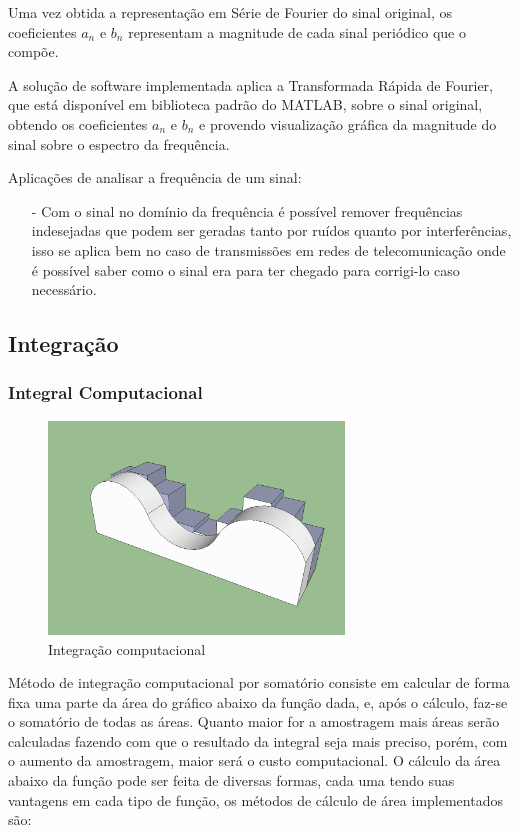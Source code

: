\documentclass[12pt,a4paper]{report}
\begin{document}
Uma vez obtida a representação em Série de Fourier do sinal original, os coeficientes \(a_{n}\) e \(b_{n}\) representam a magnitude de cada sinal periódico que o compõe.

A solução de software implementada aplica a Transformada Rápida de Fourier, que está disponível em biblioteca padrão do MATLAB, sobre o sinal original, obtendo os coeficientes \(a_{n}\) e \(b_{n}\) e provendo visualização gráfica da magnitude do sinal sobre o espectro da frequência.

Aplicações de analisar a frequência de um sinal:

\begin{itemize}
\item [-] Com o sinal no domínio da frequência é possível remover frequências indesejadas que podem ser geradas tanto por ruídos quanto por interferências, isso se aplica bem no caso de transmissões em redes de telecomunicação onde é possível saber como o sinal era para ter chegado para corrigi-lo caso necessário.
\end{itemize}

\subsection{Integração}

\subsubsection{Integral Computacional}

\begin{figure}[h]
\centering
\includegraphics[width=0.7\textwidth]{integracao.png}
\caption{Integração computacional}
\label{fig:integracao}
\end{figure}

Método de integração computacional por somatório consiste em calcular de forma fixa uma parte da área do gráfico abaixo da função dada, e, após o cálculo, faz-se o somatório de todas as áreas. Quanto maior for a amostragem mais áreas serão calculadas fazendo com que o resultado da integral seja mais preciso, porém, com o aumento da amostragem, maior será o custo computacional. O cálculo da área abaixo da função pode ser feita de diversas formas, cada uma tendo suas vantagens em cada tipo de função, os métodos de cálculo de área implementados são:
\end{document}
